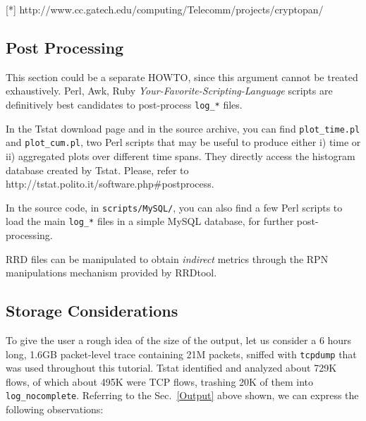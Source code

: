 \documentclass[11pt]{article}
\begin{document}
[*] \textsf{http://www.cc.gatech.edu/computing/Telecomm/projects/cryptopan/}

\subsection{Post Processing\label{Post_Processing}}


This section could be a separate HOWTO, since this
argument cannot be treated exhaustively. Perl, Awk, Ruby
\textit{Your-Favorite-Scripting-Language} scripts are definitively
best candidates to post-process \texttt{log\_*} files.



In the Tstat download page and in the source archive, you
can find \texttt{plot\_time.pl} and \texttt{plot\_cum.pl}, two Perl scripts that may be useful
to produce either i) time or ii) aggregated plots over different time spans.
They directly access the histogram database created by Tstat.
Please, refer to \textsf{http://tstat.polito.it/software.php\#postprocess}.



In the source code, in \texttt{scripts/MySQL/}, you can also find a few Perl 
scripts to load the main \texttt{log\_*} files in a simple MySQL database, for further 
post-processing.



RRD files can be manipulated to obtain \textit{indirect} 
metrics through the RPN manipulations mechanism provided 
by RRDtool.

\subsection{Storage Considerations\label{Storage_Considerations}}


To give the user a rough idea of the size of the output,
let us consider a 6 hours long, 1.6GB packet-level trace containing 
21M packets, sniffed with \texttt{tcpdump} that was used throughout this tutorial.
Tstat identified and analyzed about 729K flows, of which about 495K were 
TCP flows, trashing 20K of them into \texttt{log\_nocomplete}.
Referring to the Sec.~\ref{Output} above shown,
we can express the following observations:
\end{document}
